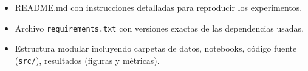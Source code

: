 \documentclass[conference]{IEEEtran}
\begin{document}


\begin{itemize}
    \item README.md con instrucciones detalladas para reproducir los experimentos.
    \item Archivo \texttt{requirements.txt} con versiones exactas de las dependencias usadas.
    \item Estructura modular incluyendo carpetas de datos, notebooks, código fuente (\texttt{src/}), resultados (figuras y métricas).
\end{itemize}
\end{document}
